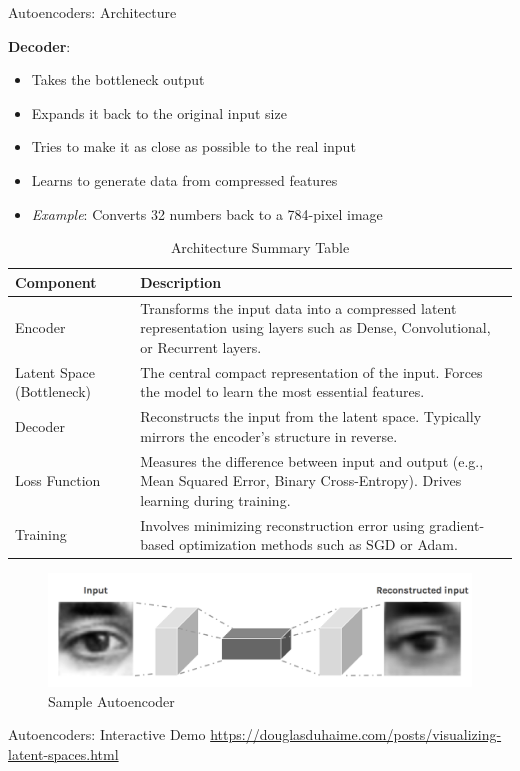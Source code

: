 \begin{frame}[allowframebreaks]{Autoencoders: Architecture}
\framebreak

\textbf{Decoder}:
\begin{itemize}
    \item Takes the bottleneck output
    \item Expands it back to the original input size
    \item Tries to make it as close as possible to the real input
    \item Learns to generate data from compressed features
    \item \textit{Example}: Converts 32 numbers back to a 784-pixel image
\end{itemize}

\framebreak

\begin{table}[h!]
\centering
\begin{tabular}{|>{\raggedright\arraybackslash}m{2cm}|>{\raggedright\arraybackslash}m{8cm}|}
\hline
\textbf{Component} & \textbf{Description} \\
\hline
Encoder & Transforms the input data into a compressed latent representation using layers such as Dense, Convolutional, or Recurrent layers. \\
\hline
Latent Space (Bottleneck) & The central compact representation of the input. Forces the model to learn the most essential features. \\
\hline
Decoder & Reconstructs the input from the latent space. Typically mirrors the encoder’s structure in reverse. \\
\hline
Loss Function & Measures the difference between input and output (e.g., Mean Squared Error, Binary Cross-Entropy). Drives learning during training. \\
\hline
Training & Involves minimizing reconstruction error using gradient-based optimization methods such as SGD or Adam. \\
\hline
\end{tabular}
\caption*{Architecture Summary Table}
\end{table}

\framebreak

\begin{figure}
    \centering
    \includegraphics[height=0.9\textheight, width=\textwidth, keepaspectratio]{images/autoencoders/sample.png}
    \caption*{Sample Autoencoder}
\end{figure}
\end{frame}

\begin{frame}{Autoencoders: Interactive Demo}
    \centering
    \href{https://douglasduhaime.com/posts/visualizing-latent-spaces.html}{https://douglasduhaime.com/posts/visualizing-latent-spaces.html}
\end{frame}